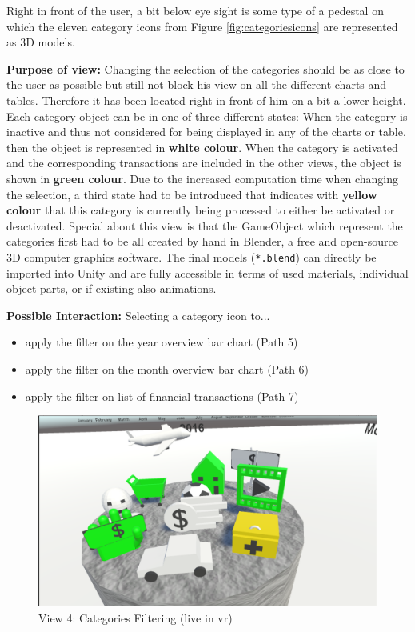 Right in front of the user, a bit below eye sight is some type of a pedestal on which the eleven category icons from Figure \ref{fig:categoriesicons} are represented as 3D models. 

\textbf{Purpose of view:} Changing the selection of the categories should be as close to the user as possible but still not block his view on all the different charts and tables. Therefore it has been located right in front of him on a bit a lower height. Each category object can be in one of three different states: When the category is inactive and thus not considered for being displayed in any of the charts or table, then the object is represented in \textbf{white colour}. When the category is activated and the corresponding transactions are included in the other views, the object is shown in \textbf{green colour}. Due to the increased computation time when changing the selection, a third state had to be introduced that indicates with \textbf{yellow colour} that this category is currently being processed to either be activated or deactivated. \newline
Special about this view is that the GameObject which represent the categories first had to be all created by hand in Blender, a free and open-source 3D computer graphics software. The final models (\texttt{*.blend}) can directly be imported into Unity and are fully accessible in terms of used materials, individual object-parts, or if existing also animations.

\textbf{Possible Interaction:} Selecting a category icon to...
\begin{itemize}[noitemsep,nolistsep]
	\item apply the filter on the year overview bar chart (Path 5)
	\item apply the filter on the month overview bar chart (Path 6)
	\item apply the filter on list of financial transactions (Path 7)
\end{itemize}

\begin{figure}[t]
	\begin{center}
		\includegraphics[width=12cm]{03_Figures/08_Development/View4_CategoriesFiltering_Loading.png}
		\caption{View 4: Categories Filtering (live in \gls{vr})}
		\label{fig:unityview4}
	\end{center}
\end{figure}


